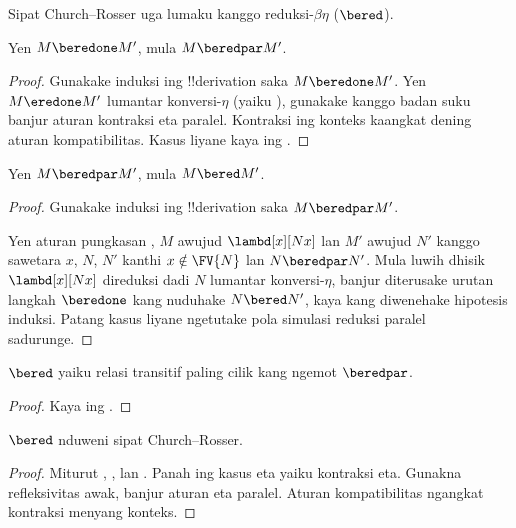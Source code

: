 \documentclass[../../../include/open-logic-section]{subfiles}
\begin{document}


Sipat Church--Rosser
uga lumaku kanggo
reduksi-$\beta\eta$ ($\bered$).

\begin{lem}
  Yen $M \beredone M'$,
  mula $M \beredpar M'$.
\end{lem}

\begin{proof}
  Gunakake induksi ing !!{derivation}
  saka $M \beredone M'$.
  Yen $M \eredone M'$
  lumantar konversi-$\eta$
  (yaiku
  ),
  gunakake
  kanggo badan suku banjur
  aturan kontraksi eta paralel.
  Kontraksi ing konteks kaangkat
  dening aturan kompatibilitas.
  Kasus liyane kaya ing
  .
\end{proof}

\begin{lem}
  Yen $M \beredpar M'$,
  mula $M \bered M'$.
\end{lem}

\begin{proof} Gunakake induksi ing
  !!{derivation} saka
  $M \beredpar M'$.

  Yen aturan pungkasan
  ,
  $M$ awujud
  $\lambd[x][Nx]$
  lan $M'$ awujud
  $N'$ kanggo sawetara
  $x$, $N$, $N'$ kanthi
  $x \notin \FV{N}$ lan
  $N \beredpar N'$.
  Mula luwih dhisik
  $\lambd[x][Nx]$
  direduksi dadi $N$
  lumantar konversi-$\eta$,
  banjur diterusake
  urutan langkah
  $\beredone$ kang
  nuduhake $N \bered N'$,
  kaya kang diwenehake
  hipotesis induksi.
  Patang kasus liyane
  ngetutake pola simulasi
  reduksi paralel sadurunge.
\end{proof}

\begin{lem}
  $\bered$ yaiku relasi
  transitif paling cilik
  kang ngemot $\beredpar$.
\end{lem}

\begin{proof}
  Kaya ing .
\end{proof}

\begin{thm}
  $\bered$ nduweni
  sipat Church--Rosser.
\end{thm}

\begin{proof}
  Miturut ,
  ,
  lan .
  Panah ing kasus eta yaiku kontraksi eta. Gunakna refleksivitas awak, banjur aturan eta paralel. Aturan kompatibilitas ngangkat kontraksi menyang konteks.
\end{proof}
\end{document}
